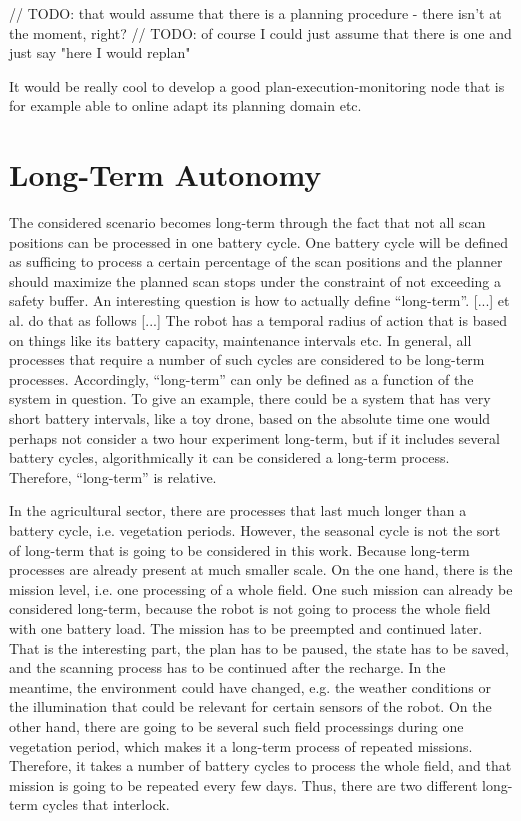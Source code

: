 \documentclass[german, master, expose, latin1]{base/thesis_KBS}
\begin{document}
// TODO: that would assume that there is a planning procedure - there isn't at the moment, right?\newline
// TODO: of course I could just assume that there is one and just say "here I would replan"\newline

It would be really cool to develop a good plan-execution-monitoring node that is for example able to online adapt its planning domain etc.

\section{Long-Term Autonomy}

The considered scenario becomes long-term through the fact that not all scan positions can be processed in one battery cycle.
One battery cycle will be defined as sufficing to process a certain percentage of the scan positions and the planner should maximize the planned scan stops under the
constraint of not exceeding a safety buffer. \newline
An interesting question is how to actually define ``long-term''. [...] et al. do that as follows [...] The robot has a temporal radius of action that is based
on things like its battery capacity, maintenance intervals etc. In general, all processes that require a number of such cycles are considered to be long-term processes.
Accordingly, ``long-term'' can only be defined as a function of the system in question. To give an example, there could be a system that has very short battery intervals,
like a toy drone, based on the absolute time one would perhaps not consider a two hour experiment long-term, but if it includes several battery cycles, algorithmically
it can be considered a long-term process. Therefore, ``long-term'' is relative.

In the agricultural sector, there are processes that last much longer than a battery cycle, i.e. vegetation periods.
However, the seasonal cycle is not the sort of long-term that is going to be considered in this work. Because long-term processes are already present at much smaller scale.
On the one hand, there is the mission level, i.e. one processing of a whole field. One such mission can already be considered long-term, because the robot is not 
going to process the whole field with one battery load. The mission has to be preempted and continued later. That is the interesting part, the plan has to be paused,
the state has to be saved, and the scanning process has to be continued after the recharge. In the meantime, the environment could have changed, e.g. the weather conditions
or the illumination that could be relevant for certain sensors of the robot. On the other hand, there are going to be several such field processings during one vegetation
period, which makes it a long-term process of repeated missions. Therefore, it takes a number of battery cycles to process the whole field, and that mission is going to be
repeated every few days. Thus, there are two different long-term cycles that interlock.
\end{document}
